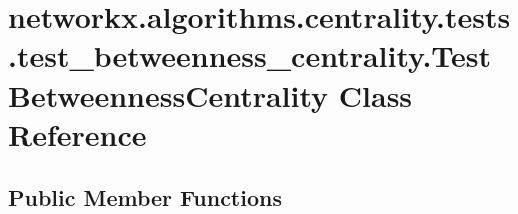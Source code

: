 \hypertarget{classnetworkx_1_1algorithms_1_1centrality_1_1tests_1_1test__betweenness__centrality_1_1TestBetweennessCentrality}{}\section{networkx.\+algorithms.\+centrality.\+tests.\+test\+\_\+betweenness\+\_\+centrality.\+Test\+Betweenness\+Centrality Class Reference}
\label{classnetworkx_1_1algorithms_1_1centrality_1_1tests_1_1test__betweenness__centrality_1_1TestBetweennessCentrality}
\subsection*{Public Member Functions}
